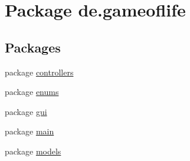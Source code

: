 \hypertarget{namespacede_1_1gameoflife}{\section{Package de.\-gameoflife}
\label{namespacede_1_1gameoflife}
}
\subsection*{Packages}
\begin{DoxyCompactItemize}
\item 
package \hyperlink{namespacede_1_1gameoflife_1_1controllers}{controllers}
\item 
package \hyperlink{namespacede_1_1gameoflife_1_1enums}{enums}
\item 
package \hyperlink{namespacede_1_1gameoflife_1_1gui}{gui}
\item 
package \hyperlink{namespacede_1_1gameoflife_1_1main}{main}
\item 
package \hyperlink{namespacede_1_1gameoflife_1_1models}{models}
\end{DoxyCompactItemize}
